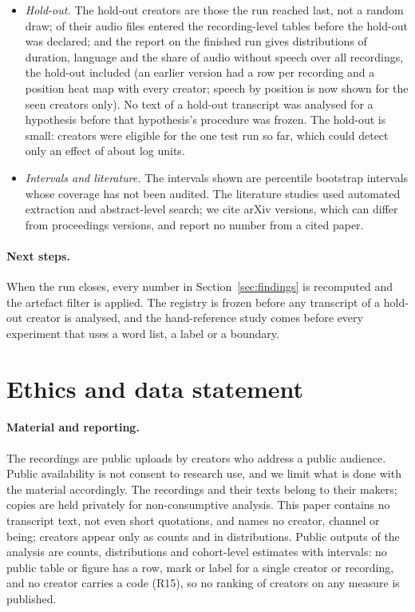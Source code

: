 \documentclass[letterpaper]{article} %
\begin{document}
\begin{itemize}
\item \emph{Hold-out.} The \NHoldout{} hold-out creators are those the run reached last, not a random draw; \HoldoutInSnapshot{} of their audio files entered the recording-level tables before the hold-out was declared; and the report on the finished run gives distributions of duration, language and the share of audio without speech over all recordings, the hold-out included (an earlier version had a row per recording and a position heat map with every creator; speech by position is now shown for the seen creators only). No text of a hold-out transcript was analysed for a hypothesis before that hypothesis's procedure was frozen. The hold-out is small: \HThreeCreators{} creators were eligible for the one test run so far, which could detect only an effect of about \HThreeDetectable{} log units.
\item \emph{Intervals and literature.} The intervals shown are percentile bootstrap intervals whose coverage has not been audited. The literature studies used automated extraction and abstract-level search; we cite arXiv versions, which can differ from proceedings versions, and report no number from a cited paper.
\end{itemize}

\paragraph{Next steps.} When the run closes, every number in Section~\ref{sec:findings} is recomputed and the artefact filter is applied. The registry is frozen before any transcript of a hold-out creator is analysed, and the hand-reference study comes before every experiment that uses a word list, a label or a boundary.

\section{Ethics and data statement}
\label{sec:ethics}

\paragraph{Material and reporting.} The recordings are public uploads by creators who address a public audience. Public availability is not consent to research use, and we limit what is done with the material accordingly. The recordings and their texts belong to their makers; copies are held privately for non-consumptive analysis. This paper contains no transcript text, not even short quotations, and names no creator, channel or being; creators appear only as counts and in distributions. Public outputs of the analysis are counts, distributions and cohort-level estimates with intervals: no public table or figure has a row, mark or label for a single creator or recording, and no creator carries a code (R15), so no ranking of creators on any measure is published.
\end{document}
